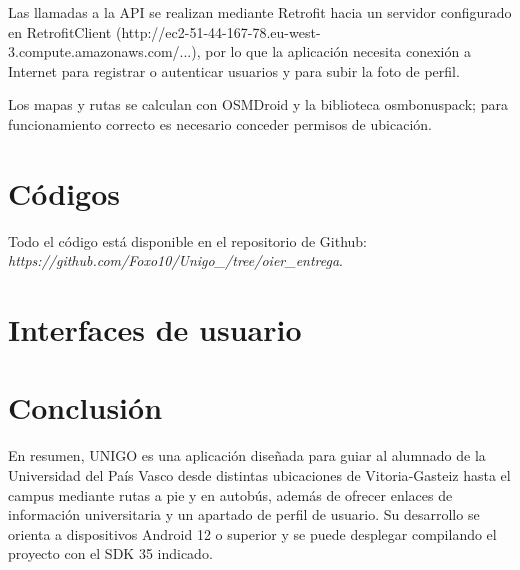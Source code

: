 \documentclass[11pt,a4paper]{article}
\begin{document}
Las llamadas a la API se realizan mediante Retrofit hacia un servidor configurado en RetrofitClient (http://ec2-51-44-167-78.eu-west-3.compute.amazonaws.com/...), por lo que la aplicación necesita conexión a Internet para registrar o autenticar usuarios y para subir la foto de perfil.

Los mapas y rutas se calculan con OSMDroid y la biblioteca osmbonuspack; para funcionamiento correcto es necesario conceder permisos de ubicación.

\section{Códigos}

Todo el código está disponible en el repositorio de Github: \\ \textit{https://github.com/Foxo10/Unigo\_/tree/oier\_entrega}.



\section{Interfaces de usuario}



\section{Conclusión}
En resumen, UNIGO es una aplicación diseñada para guiar al alumnado de la Universidad del País Vasco desde distintas ubicaciones de Vitoria‑Gasteiz hasta el campus mediante rutas a pie y en autobús, además de ofrecer enlaces de información universitaria y un apartado de perfil de usuario. Su desarrollo se orienta a dispositivos Android 12 o superior y se puede desplegar compilando el proyecto con el SDK 35 indicado.



\newpage
\end{document}
